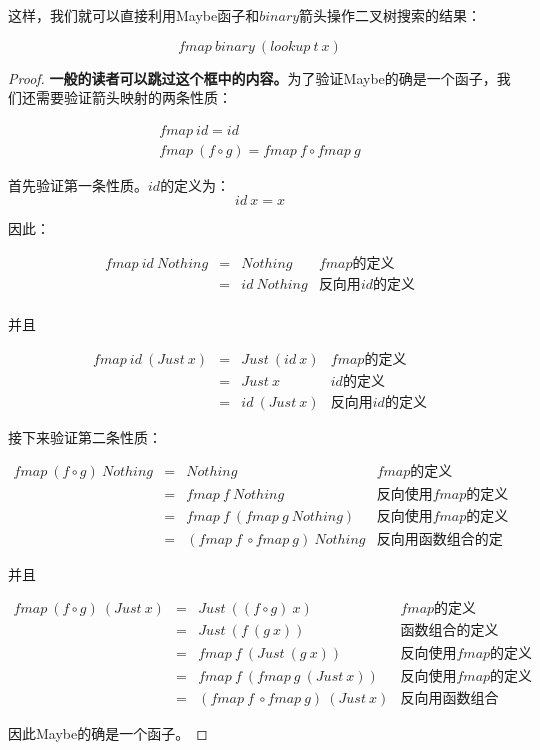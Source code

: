 \documentclass{article}
\begin{document}
\begin{example}
这样，我们就可以直接利用Maybe函子和$binary$箭头操作二叉树搜索的结果：

\[
fmap\ binary\ (lookup\ t\ x)
\]

\begin{mdframed}
\begin{proof}
\textbf{一般的读者可以跳过这个框中的内容。}为了验证Maybe的确是一个函子，我们还需要验证箭头映射的两条性质：

\[
\begin{array}{l}
fmap\ id = id \\
fmap\ (f \circ g) = fmap\ f \circ fmap\ g
\end{array}
\]

首先验证第一条性质。$id$的定义为：
\[
id\ x = x
\]

因此：

\[
\begin{array}{rcll}
fmap\ id\ Nothing & = & Nothing & \text{$fmap$的定义} \\
                  & = & id\ Nothing & \text{反向用$id$的定义} \\
\end{array}
\]

并且

\[
\begin{array}{rcll}
fmap\ id\ (Just\ x) & = & Just\ (id\ x) & \text{$fmap$的定义} \\
                    & = & Just\ x & \text{$id$的定义} \\
                    & = & id\ (Just\ x) & \text{反向用$id$的定义}
\end{array}
\]

接下来验证第二条性质：

\[
\begin{array}{rcll}
fmap\ (f \circ g)\ Nothing & = & Nothing & \text{$fmap$的定义} \\
           & = & fmap\ f\ Nothing & \text{反向使用$fmap$的定义} \\
           & = & fmap\ f\ (fmap\ g\ Nothing) & \text{反向使用$fmap$的定义} \\
           & = & (fmap\ f\ \circ fmap\ g)\ Nothing & \text{反向用函数组合的定义}
\end{array}
\]

并且

\[
\begin{array}{rcll}
fmap\ (f \circ g)\ (Just\ x) & = & Just\ ((f \circ g)\ x) & \text{$fmap$的定义} \\
           & = & Just\ (f\ (g\ x)) & \text{函数组合的定义} \\
           & = & fmap\ f\ (Just\ (g\ x)) & \text{反向使用$fmap$的定义} \\
           & = & fmap\ f\ (fmap\ g\ (Just\ x)) & \text{反向使用$fmap$的定义} \\
           & = & (fmap\ f\ \circ fmap\ g)\ (Just\ x) & \text{反向用函数组合的定义}
\end{array}
\]

因此Maybe的确是一个函子。
\end{proof}
\end{mdframed}
\end{example}
\end{document}

